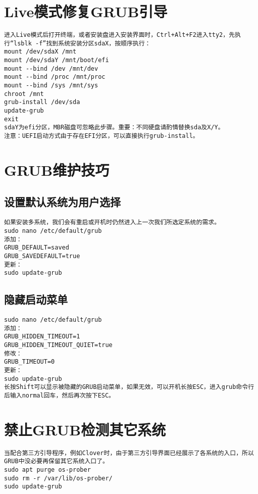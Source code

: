 \documentclass[a4paper,fontset=fandol,zihao=-4,linespread=1.2]{ctexbook}
\begin{document}
\section{Live模式修复GRUB引导}
\begin{lstlisting}
进入Live模式后打开终端，或者安装盘进入安装界面时，Ctrl+Alt+F2进入tty2，先执行“lsblk -f”找到系统安装分区sdaX，按顺序执行：
mount /dev/sdaX /mnt
mount /dev/sdaY /mnt/boot/efi
mount --bind /dev /mnt/dev
mount --bind /proc /mnt/proc
mount --bind /sys /mnt/sys
chroot /mnt
grub-install /dev/sda
update-grub
exit
sdaY为efi分区，MBR磁盘可忽略此步骤。重要：不同硬盘请酌情替换sda及X/Y。
注意：UEFI启动方式由于存在EFI分区，可以直接执行grub-install。
\end{lstlisting}

\section{GRUB维护技巧}

\subsection{设置默认系统为用户选择}
\begin{lstlisting}
如果安装多系统，我们会有重启或开机时仍然进入上一次我们所选定系统的需求。
sudo nano /etc/default/grub
添加：
GRUB_DEFAULT=saved
GRUB_SAVEDEFAULT=true
更新：
sudo update-grub
\end{lstlisting}

\subsection{隐藏启动菜单}
\begin{lstlisting}
sudo nano /etc/default/grub
添加：
GRUB_HIDDEN_TIMEOUT=1
GRUB_HIDDEN_TIMEOUT_QUIET=true
修改：
GRUB_TIMEOUT=0
更新：
sudo update-grub
长按Shift可以显示被隐藏的GRUB启动菜单，如果无效，可以开机长按ESC，进入grub命令行后输入normal回车，然后再次按下ESC。
\end{lstlisting}

\section{禁止GRUB检测其它系统}
\begin{lstlisting}
当配合第三方引导程序，例如Clover时，由于第三方引导界面已经展示了各系统的入口，所以GRUB中没必要再保留其它系统入口了。
sudo apt purge os-prober
sudo rm -r /var/lib/os-prober/
sudo update-grub
\end{lstlisting}
\end{document}
